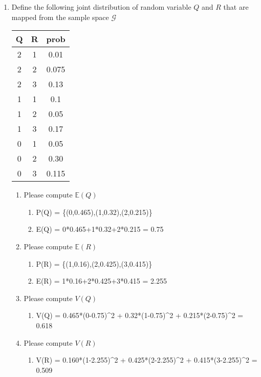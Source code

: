 \documentclass[krantz1,ChapterTOCs]{krantz}
\begin{document}
\begin{enumerate}
    \item Define the following joint distribution of random variable $Q$ and $R$ that are mapped from the sample space $\mathcal{G}$
    \begin{table}[ht!]
    \centering
    \begin{tabular}{c c | c}
        Q & R & prob \\
        \hline
        2 & 1 & 0.01\\
        2 & 2 & 0.075\\
        2 & 3 & 0.13\\
        1 & 1 & 0.1\\
        1 & 2 & 0.05\\
        1 & 3 & 0.17\\
        0 & 1 & 0.05\\
        0 & 2 & 0.30\\
        0 & 3 & 0.115
    \end{tabular}
    \end{table}
     \begin{enumerate}
         \item Please compute $\mathbb{E}(Q)$
         
         \begin{enumerate}
             \item {\color{red}  P(Q) = \{(0,0.465),(1,0.32),(2,0.215)\}}
             \item {\color{red}  E(Q) = 0*0.465+1*0.32+2*0.215 = 0.75}
         \end{enumerate}
         
         \item Please compute $\mathbb{E}(R)$
         \begin{enumerate}
             \item {\color{red}  P(R) = \{(1,0.16),(2,0.425),(3,0.415)\}}
             \item {\color{red}  E(R) = 1*0.16+2*0.425+3*0.415 = 2.255}
         \end{enumerate}

         \item Please compute $V(Q)$
         \begin{enumerate}
             \item {\color{red}  V(Q) = 0.465*(0-0.75)^2 + 0.32*(1-0.75)^2 + 0.215*(2-0.75)^2 = 0.618    }
         \end{enumerate}
         
         \item Please compute $V(R)$
         \begin{enumerate}
             \item {\color{red}  V(R) = 0.160*(1-2.255)^2 + 0.425*(2-2.255)^2 + 0.415*(3-2.255)^2 = 0.509  }
         \end{enumerate}
         

\end{enumerate}
\end{enumerate}
\end{document}

